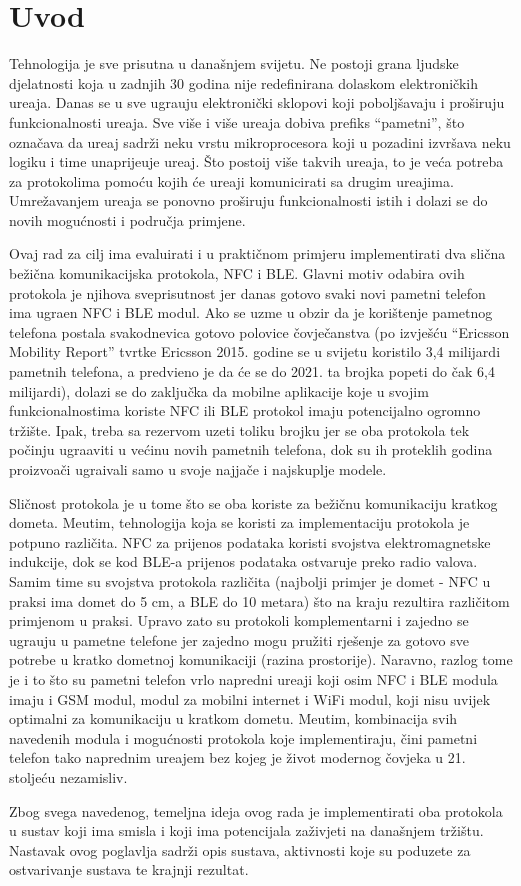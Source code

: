 \chapter{Uvod}

Tehnologija je sve prisutna u dana\v{s}njem svijetu. Ne postoji grana ljudske djelatnosti koja u zadnjih 30 godina nije redefinirana dolaskom elektroni\v{c}kih ure\dj aja. Danas se u sve ugra\dj uju elektroni\v{c}ki sklopovi koji pobolj\v{s}avaju i pro\v{s}iruju funkcionalnosti ure\dj aja. Sve vi\v{s}e i vi\v{s}e ure\dj aja dobiva prefiks ``pametni'', \v{s}to ozna\v{c}ava da ure\dj aj sadr\v{z}i neku vrstu mikroprocesora koji u pozadini izvr\v{s}ava neku logiku i time unaprije\dj uje ure\dj aj. \v{S}to postoij vi\v{s}e takvih ure\dj aja, to je ve\'{c}a potreba za protokolima pomo\'{c}u kojih \'{c}e ure\dj aji komunicirati sa drugim ure\dj ajima. Umre\v{z}avanjem ure\dj aja se ponovno pro\v{s}iruju funkcionalnosti istih i dolazi se do novih mogu\'{c}nosti i podru\v{c}ja primjene.

Ovaj rad za cilj ima evaluirati i u prakti\v{c}nom primjeru implementirati dva sli\v{c}na be\v{z}i\v{c}na komunikacijska protokola, NFC i BLE. Glavni motiv odabira ovih protokola je njihova sveprisutnost jer danas gotovo svaki novi pametni telefon ima ugra\dj en NFC i BLE modul. Ako se uzme u obzir da je kori\v{s}tenje pametnog telefona postala svakodnevica gotovo polovice \v{c}ovje\v{c}anstva (po izvje\v{s}\'{c}u ``Ericsson Mobility Report'' tvrtke Ericsson \cite{mobilityReport} 2015. godine se u svijetu koristilo 3,4 milijardi pametnih telefona, a predvi\dj eno je da \'{c}e se do 2021. ta brojka popeti do \v{c}ak 6,4 milijardi), dolazi se do zaklju\v{c}ka da mobilne aplikacije koje u svojim funkcionalnostima koriste NFC ili BLE protokol imaju potencijalno ogromno tr\v{z}i\v{s}te. Ipak, treba sa rezervom uzeti toliku brojku jer se oba protokola tek po\v{c}inju ugra\dj aviti u ve\'{c}inu novih pametnih telefona, dok su ih proteklih godina proizvo\dj a\v{c}i ugra\dj ivali samo u svoje najja\v{c}e i najskuplje modele.

Sli\v{c}nost protokola je u tome \v{s}to se oba koriste za be\v{z}i\v{c}nu komunikaciju kratkog dometa. Me\dj utim, tehnologija koja se koristi za implementaciju protokola je potpuno razli\v{c}ita. NFC za prijenos podataka koristi svojstva elektromagnetske indukcije, dok se kod BLE-a prijenos podataka ostvaruje preko radio valova. Samim time su svojstva protokola razli\v{c}ita (najbolji primjer je domet - NFC u praksi ima domet do 5 cm, a BLE do 10 metara) \v{s}to na kraju rezultira razli\v{c}itom primjenom u praksi. Upravo zato su protokoli komplementarni i zajedno se ugra\dj uju u pametne telefone jer zajedno mogu pru\v{z}iti rje\v{s}enje za gotovo sve potrebe u kratko dometnoj komunikaciji (razina prostorije). Naravno, razlog tome je i to \v{s}to su pametni telefon vrlo napredni ure\dj aji koji osim NFC i BLE modula imaju i GSM modul, modul za mobilni internet i WiFi modul, koji nisu uvijek optimalni za komunikaciju u kratkom dometu. Me\dj utim, kombinacija svih navedenih modula i mogu\'{c}nosti protokola koje implementiraju, \v{c}ini pametni telefon tako naprednim ure\dj ajem bez kojeg je \v{z}ivot modernog \v{c}ovjeka u 21. stolje\'{c}u nezamisliv.

Zbog svega navedenog, temeljna ideja ovog rada je implementirati oba protokola u sustav koji ima smisla i koji ima potencijala za\v{z}ivjeti na dana\v{s}njem tr\v{z}i\v{s}tu. Nastavak ovog poglavlja sadr\v{z}i opis sustava, aktivnosti koje su poduzete za ostvarivanje sustava te krajnji rezultat.
